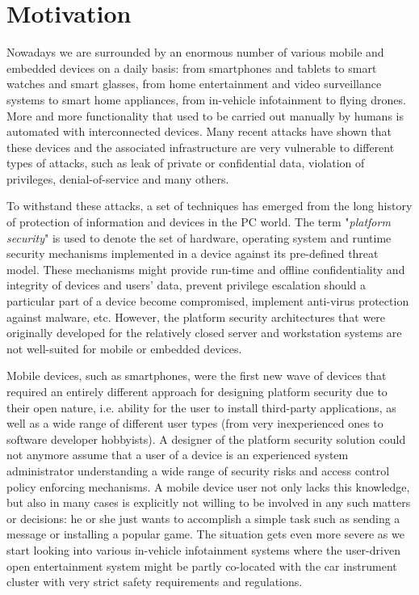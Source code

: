 
\section{Motivation}

Nowadays we are surrounded by an enormous number of various mobile and embedded devices on a daily basis: from smartphones and tablets to smart watches and smart glasses, from home entertainment and video surveillance systems to smart home appliances, from in-vehicle infotainment to flying drones. More and more functionality that used to be carried out manually by humans is automated with interconnected devices. Many recent attacks have shown that these devices and the associated infrastructure are very vulnerable to different types of attacks, such as leak of private or confidential data, violation of privileges, denial-of-service and many others. 

To withstand these attacks, a set of techniques has emerged from the long history of protection of information and devices in the PC world. The term "\textit{platform security}" is used to denote the set of hardware, operating system and runtime security mechanisms implemented in a device against its pre-defined threat model. These mechanisms might provide run-time and offline confidentiality and integrity of devices and users' data, prevent privilege escalation should a particular part of a device become compromised, implement anti-virus protection against malware, etc. However, the platform security architectures that were originally developed for the relatively closed server and workstation systems are not well-suited for mobile or embedded devices. 

Mobile devices, such as smartphones, were the first new wave of devices that required an entirely different approach for designing platform security due to their open nature, i.e. ability for the user to install third-party applications, as well as a wide range of different user types (from very inexperienced ones to software developer hobbyists). A designer of the platform security solution could not anymore assume that a user of a device is an experienced system administrator understanding a wide range of security risks and access control policy enforcing mechanisms. A mobile device user not only lacks this knowledge, but also in many cases is explicitly not willing to be involved in any such matters or decisions: he or she just wants to accomplish a simple task such as sending a message or installing a popular game. The situation gets even more severe as we start looking into various in-vehicle infotainment systems where the user-driven open entertainment system might be partly co-located with the car instrument cluster with very strict safety requirements and regulations. 

